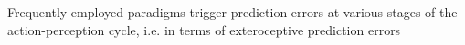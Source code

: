 Frequently employed paradigms trigger prediction errors at various stages of the action-perception cycle, i.e. in terms of exteroceptive prediction errors \cites{cohen, cavahang, mmn_stuff}


















